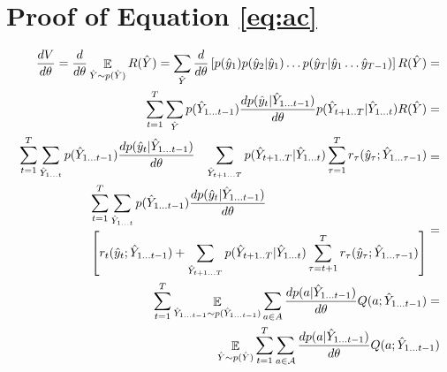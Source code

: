 \documentclass{article} \usepackage{iclr2017_conference,times}
\DeclareMathOperator*{\Exp}{\mathbb{E}}
\begin{document}
\newpage

\section{Proof of Equation \eqref{eq:ac}}

\begin{align*}
    \frac{dV}{d\theta} = 
    \frac{d}{d\theta} \Exp_{\hat{Y} \sim p(\hat{Y})} R(\hat{Y}) =
    \sum\limits_{\hat{Y}}
    \frac{d}{d\theta}
    \left[
    p(\hat{y}_1) p(\hat{y}_2|\hat{y}_1) 
    \ldots
    p(\hat{y}_T|\hat{y}_1 \ldots \hat{y}_{T-1})
    \right]
    R(\hat{Y}) = \notag\\
    \sum\limits_{t=1}^T
    \sum\limits_{\hat{Y}}
    p(\hat{Y}_{1 \ldots t-1})
    \frac{dp(\hat{y}_t|\hat{Y}_{1 \ldots t - 1})}{d\theta}
    p(\hat{Y}_{t+1 .. T}|\hat{Y}_{1 \ldots t})
    R(\hat{Y}) = \notag\\
    \begin{aligned}
        & \sum\limits_{t=1}^T
          \sum\limits_{\hat{Y}_{1 \ldots t}}
          p(\hat{Y}_{1 \ldots t-1})
          \frac{dp(\hat{y}_t|\hat{Y}_{1 \ldots t - 1})}{d\theta}
        &  \sum\limits_{\hat{Y}_{t + 1 \ldots T}}
           p(\hat{Y}_{t+1 .. T}|\hat{Y}_{1 \ldots t})
           \sum\limits_{\tau=1}^T 
           r_{\tau}(\hat{y}_{\tau}; \hat{Y}_{1 \ldots \tau - 1})
    \end{aligned} 
    =\notag\\
    \begin{aligned}
        & \sum\limits_{t=1}^T
          \sum\limits_{\hat{Y}_{1 \ldots t}}
          p(\hat{Y}_{1 \ldots t-1})
          \frac{dp(\hat{y}_t|\hat{Y}_{1 \ldots t - 1})}{d\theta} \\
        &  \left[
          r_t(\hat{y}_t; \hat{Y}_{1 \ldots t - 1}) +
          \sum\limits_{\hat{Y}_{t + 1 \ldots T}}
           p(\hat{Y}_{t+1 .. T}|\hat{Y}_{1 \ldots t})
           \sum\limits_{\tau=t+1}^T 
           r_{\tau}(\hat{y}_{\tau}; \hat{Y}_{1 \ldots \tau - 1})
           \right]
    \end{aligned} 
    = \notag\\
    \sum\limits_{t=1}^T
    \Exp_{\hat{Y}_{1 \ldots t - 1} \sim p(\hat{Y}_{1 \ldots t - 1})}
    \sum\limits_{a \in A}
    \frac{dp(a|\hat{Y}_{1 \ldots t - 1})}{d\theta}
    Q(a;\hat{Y}_{1 \ldots t - 1}) 
    = \notag\\
    \Exp_{\hat{Y} \sim p(\hat{Y})} 
    \sum\limits_{t=1}^T
    \sum\limits_{a \in \mathcal{A}}
    \frac{dp(a|\hat{Y}_{1 \ldots t - 1})}{d\theta}
    Q(a;\hat{Y}_{1 \ldots t - 1})
\end{align*}    

 
\end{document}
